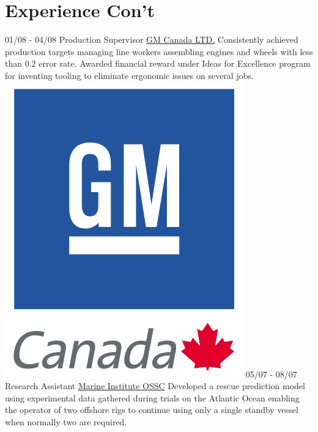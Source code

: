 \documentclass[]{friggeri-cv}
\begin{document}
\section{Experience Con't}
\begin{entrylist}
    \tentry
    {01/08 - 04/08}
    {Production Supervisor}
    {\href{https://www.gm.ca/en/home.html}{GM Canada LTD.}}
    {Consistently achieved production targets managing line workers assembling engines and wheels with less than 0.2 error rate. Awarded financial reward under Ideas for Excellence program for inventing tooling to eliminate ergonomic issues on several jobs.}{\hfill \includegraphics[scale=0.14]{img/GM_Canada.png}}
    \tentry
	{05/07 - 08/07}
	{Research Assistant}
	{\href{https://www.mi.mun.ca//departments/offshoresafetyandsurvivalcentreossc/}{Marine Institute OSSC}}
	{Developed a rescue prediction model using experimental data gathered during trials on the Atlantic Ocean enabling the operator of two offshore rigs to continue using only a single standby vessel when normally two are required.}

\end{entrylist}
\end{document}
